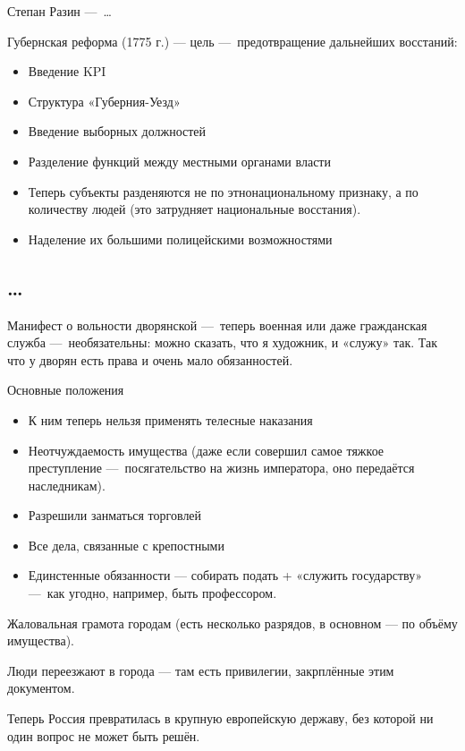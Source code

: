 \documentclass[12pt, a4paper]{article}
\begin{document}
Степан Разин — …

Губернская реформа (1775 г.) — цель — предотвращение дальнейших восстаний:

\begin{itemize}
    \item Введение KPI
    \item Структура «Губерния-Уезд»
    \item Введение выборных должностей
    \item Разделение функций между местными органами власти
    \item Теперь субъекты разденяются не по этнонациональному признаку, а по количеству людей (это затрудняет национальные восстания).
    \item Наделение их большими полицейскими возможностями
\end{itemize}


\subsection{…}

Манифест о вольности дворянской — теперь военная или даже гражданская служба 
— необязательны: можно сказать, что я художник, и «служу» так. 
Так что у дворян есть права и очень мало обязанностей.

Основные положения
\begin{itemize}
    \item К ним теперь нельзя применять телесные наказания
    \item Неотчуждаемость имущества (даже если совершил самое тяжкое преступление — посягательство на жизнь императора, оно передаётся наследникам).
    \item Разрешили занматься торговлей
    \item Все дела, связанные с крепостными
    \item Единстенные обязанности — собирать подать + «служить государству» — как угодно, например, быть профессором.
\end{itemize}

Жаловальная грамота городам (есть несколько разрядов, в основном — по объёму имущества).

Люди переезжают в города — там есть привилегии, закрплённые этим документом.


Теперь Россия превратилась в крупную европейскую державу, без которой ни один вопрос не может быть решён.
\end{document}
